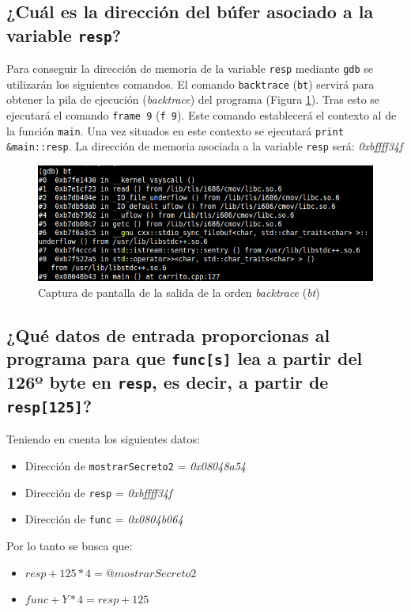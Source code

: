 \documentclass[10pt,a4paper]{article}
\begin{document}
\subsection{¿Cuál es la dirección del búfer asociado a la variable \texttt{resp}?}

Para conseguir la dirección de memoria de la variable \texttt{resp} mediante \texttt{gdb} se utilizarán los siguientes comandos. El comando \texttt{backtrace} (\texttt{bt}) servirá para obtener la pila de ejecución (\emph{backtrace}) del programa (Figura \ref{fig:bt}). Tras esto se ejecutará el comando \texttt{frame 9} (\texttt{f 9}). Este comando establecerá el contexto al de la función \texttt{main}. Una vez situados en este contexto se ejecutará \texttt{print \&{}main::resp}. La dirección de memoria asociada a la variable \texttt{resp} será: \emph{0xbffff34f}\\

\begin{figure}[h!]
\centering
\includegraphics[scale=0.8]{images/bt.png}
\caption{Captura de pantalla de la salida de la orden \emph{backtrace} (\emph{bt})}
\label{fig:bt}
\end{figure}


\subsection{¿Qué datos de entrada proporcionas al programa para que \texttt{func[s]} lea a partir del 126º byte en \texttt{resp}, es decir, a partir de \texttt{resp[125]}?}

Teniendo en cuenta los siguientes datos:
\begin{itemize}
\item Dirección de \texttt{mostrarSecreto2} = \emph{0x08048a54}
\item Dirección de \texttt{resp} = \emph{0xbffff34f}
\item Dirección de \texttt{func} = \emph{0x0804b064}
\end{itemize}


Por lo tanto se busca que:
\begin{itemize}
\item $resp + 125*4 = @mostrarSecreto2$
\item $func + Y*4 = resp + 125$
\end{itemize}
\end{document}
